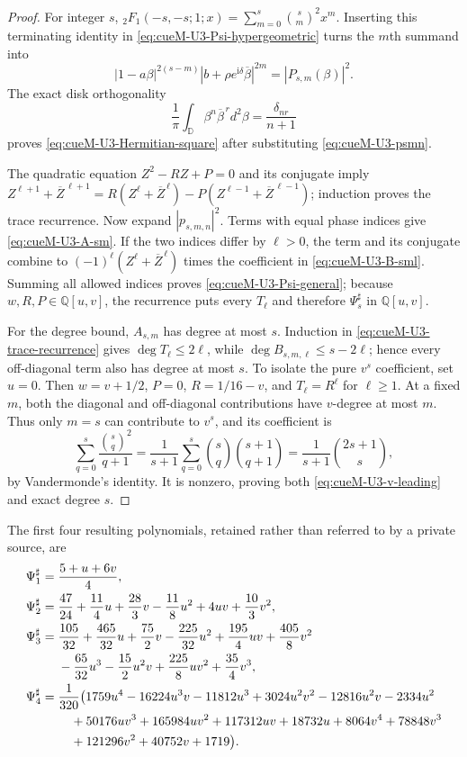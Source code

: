 \begin{proof}
For integer $s$,
${}_2F_1(-s,-s;1;x)=\sum_{m=0}^{s}\binom sm^2x^m$.  Inserting this terminating identity
in \eqref{eq:cueM-U3-Psi-hypergeometric} turns the $m$th summand into
\[
 |1-a\beta|^{2(s-m)}|b+\rho e^{\mathrm i\delta}\overline\beta|^{2m}
 =|P_{s,m}(\beta)|^2.
\]
The exact disk orthogonality
\[
 \frac1\pi\int_{\mathbb D}\beta^n\overline\beta^{\,r}d^2\beta
 =\frac{\delta_{nr}}{n+1}
\]
proves \eqref{eq:cueM-U3-Hermitian-square} after substituting
\eqref{eq:cueM-U3-psmn}.

The quadratic equation
$Z^2-RZ+P=0$ and its conjugate imply
$Z^{\ell+1}+\overline Z^{\,\ell+1}
=R(Z^\ell+\overline Z^{\,\ell})-P(Z^{\ell-1}+\overline Z^{\,\ell-1})$;
induction proves the trace recurrence.  Now expand $|p_{s,m,n}|^2$.  Terms with equal phase
indices give \eqref{eq:cueM-U3-A-sm}.  If the two indices differ by $\ell>0$, the term and its
conjugate combine to
$(-1)^\ell(Z^\ell+\overline Z^{\,\ell})$ times the coefficient in
\eqref{eq:cueM-U3-B-sml}.  Summing all allowed indices proves
\eqref{eq:cueM-U3-Psi-general}; because $w,R,P\in\mathbb Q[u,v]$, the recurrence puts every
$T_\ell$ and therefore $\Psi_s^\sharp$ in $\mathbb Q[u,v]$.

For the degree bound, $A_{s,m}$ has degree at most $s$.  Induction in
\eqref{eq:cueM-U3-trace-recurrence} gives $\deg T_\ell\leq2\ell$, while
$\deg B_{s,m,\ell}\leq s-2\ell$; hence every off-diagonal term also has degree at most $s$.
To isolate the pure $v^s$ coefficient, set $u=0$.  Then
$w=v+1/2$, $P=0$, $R=1/16-v$, and $T_\ell=R^\ell$ for $\ell\geq1$.  At a fixed $m$, both
the diagonal and off-diagonal contributions have $v$-degree at most $m$.  Thus only $m=s$
can contribute to $v^s$, and its coefficient is
\[
 \sum_{q=0}^{s}\frac{\binom sq^2}{q+1}
 =\frac1{s+1}\sum_{q=0}^{s}\binom sq\binom{s+1}{q+1}
 =\frac1{s+1}\binom{2s+1}{s},
\]
by Vandermonde's identity.  It is nonzero, proving both
\eqref{eq:cueM-U3-v-leading} and exact degree $s$.
\end{proof}

The first four resulting polynomials, retained rather than referred to by a private source,
are
\begin{align}
 \Psi_1^\sharp={}&\frac{5+u+6v}{4},
 \label{eq:cueM-Psi1}\\
 \Psi_2^\sharp={}&\frac{47}{24}+\frac{11}{4}u+\frac{28}{3}v
 -\frac{11}{8}u^2+4uv+\frac{10}{3}v^2,
 \label{eq:cueM-Psi2}\\
 \Psi_3^\sharp={}&\frac{105}{32}+\frac{465}{32}u+\frac{75}{2}v
 -\frac{225}{32}u^2+\frac{195}{4}uv+\frac{405}{8}v^2\notag\\
 &-\frac{65}{32}u^3-\frac{15}{2}u^2v+\frac{225}{8}uv^2+\frac{35}{4}v^3,
 \label{eq:cueM-Psi3}\\
 \Psi_4^\sharp={}&\frac1{320}\bigl(
 1759u^4-16224u^3v-11812u^3+3024u^2v^2-12816u^2v-2334u^2\notag\\
 &\quad+50176uv^3+165984uv^2+117312uv+18732u
 +8064v^4+78848v^3\notag\\
 &\quad+121296v^2+40752v+1719\bigr).
 \label{eq:cueM-Psi4}
\end{align}

